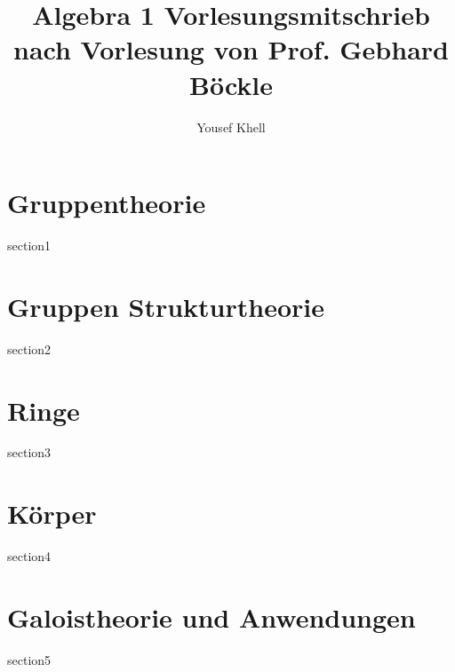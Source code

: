 \documentclass[a4paper]{report}
\title{\vspace{-2cm} Algebra 1 Vorlesungsmitschrieb\\nach Vorlesung von Prof. Gebhard Böckle}
\author{Yousef Khell}
\begin{document}
\maketitle
\tableofcontents

\chapter{Gruppentheorie}
{section1}

\chapter{Gruppen Strukturtheorie}
{section2}

\chapter{Ringe}
{section3}

\chapter{Körper}
{section4}

\chapter{Galoistheorie und Anwendungen}
{section5}
\end{document}
